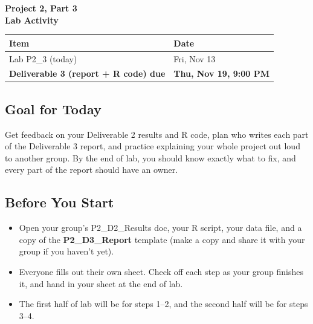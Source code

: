 \documentclass[12pt]{article}
\begin{document}
\begin{center}
\textbf{\Large Project 2, Part 3 \\ Lab Activity}
\end{center}

\nameBUID

\begin{center}
\begin{tabular}{ll}
\toprule
\textbf{Item} & \textbf{Date} \\
\midrule
Lab P2\_3 (today) & Fri, Nov 13 \\
\textbf{Deliverable 3 (report + R code) due} & \textbf{Thu, Nov 19, 9:00 PM} \\
\bottomrule
\end{tabular}
\end{center}

\subsection*{Goal for Today}
Get feedback on your Deliverable 2 results and R code, plan who writes each part of the Deliverable 3 report, and practice explaining your whole project out loud to another group. By the end of lab, you should know exactly what to fix, and every part of the report should have an owner.

\subsection*{Before You Start}
\begin{itemize}[nosep]
    \item Open your group's P2\_D2\_Results doc, your R script, your data file, and a copy of the \textbf{P2\_D3\_Report} template (make a copy and share it with your group if you haven't yet).
    \item Everyone fills out their own sheet. Check off each step as your group finishes it, and hand in your sheet at the end of lab.
    \item The first half of lab will be for steps 1--2, and the second half will be for steps 3--4.
\end{itemize}
\end{document}
